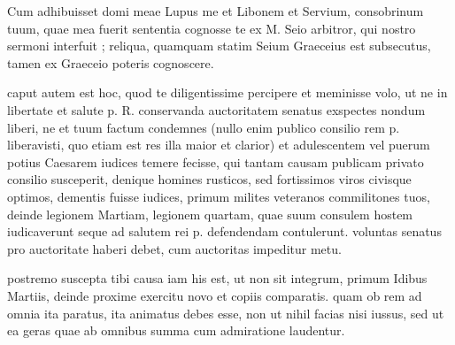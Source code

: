 


 Cum adhibuisset domi meae Lupus me et Libonem et Servium, consobrinum tuum, quae mea fuerit sententia cognosse te ex M. Seio arbitror, qui nostro sermoni interfuit ; reliqua, quamquam statim Seium Graeceius est subsecutus, tamen ex Graeceio poteris cognoscere.

 caput autem est hoc, quod te diligentissime percipere et meminisse volo, ut ne in libertate et salute p. R. conservanda auctoritatem senatus exspectes nondum liberi, ne et tuum factum condemnes (nullo enim publico consilio rem p. liberavisti, quo etiam est res illa maior et clarior) et adulescentem vel puerum potius Caesarem iudices temere fecisse, qui tantam causam publicam privato consilio susceperit, denique homines rusticos, sed fortissimos viros civisque optimos, dementis fuisse iudices, primum milites veteranos commilitones tuos, deinde legionem Martiam, legionem quartam, quae suum consulem hostem iudicaverunt seque ad salutem rei p. defendendam contulerunt. voluntas senatus pro auctoritate haberi debet, cum auctoritas impeditur metu.

 postremo suscepta tibi causa iam his est, ut non sit integrum, primum Idibus Martiis, deinde proxime exercitu novo et copiis comparatis. quam ob rem ad omnia ita paratus, ita animatus debes esse, non ut nihil facias nisi iussus, sed ut ea geras quae ab omnibus summa cum admiratione laudentur.
